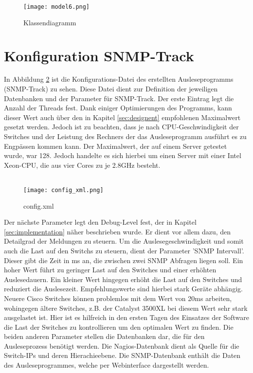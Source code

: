 \begin{figure}[H]
\centering
\texttt{[image: model6.png]}
\caption[]{Klassendiagramm}
\label{fig:classdia6}
\end{figure}

\clearpage

\section*{Konfiguration SNMP-Track}
\label{sec:config}

In Abbildung \ref{fig:config_xml} ist die Konfigurations-Datei des erstellten Ausleseprogramms (SNMP-Track) zu sehen.
Diese Datei dient zur Definition der jeweiligen Datenbanken und der Parameter für SNMP-Track.
Der erste Eintrag legt die Anzahl der Threads fest. Dank einiger Optimierungen des Programms, kann dieser Wert auch über den in Kapitel \ref{sec:designent} empfohlenen Maximalwert gesetzt werden.
Jedoch ist zu beachten, dass je nach CPU-Geschwindigkeit der Switches und der Leistung des Rechners der das Ausleseprogramm ausführt es zu Engpässen kommen kann.
Der Maximalwert, der auf einem Server getestet wurde, war 128. Jedoch handelte es sich hierbei um einen Server mit einer Intel Xeon-CPU, die aus vier Cores zu je 2.8GHz besteht.\\\\

\begin{figure}[H]
\centering
\texttt{[image: config\_xml.png]}
\caption[]{config.xml}
\label{fig:config_xml}
\end{figure}

Der nächste Parameter legt den Debug-Level fest, der in Kapitel \ref{sec:implementation} näher beschrieben wurde.
Er dient vor allem dazu, den Detailgrad der Meldungen zu steuern.
Um die Auslesegeschwindigkeit und somit auch die Last auf den Switchs zu steuern, dient der Parameter 'SNMP Intervall'.
Dieser gibt die Zeit in ms an, die zwischen zwei SNMP Abfragen liegen soll. Ein hoher Wert führt zu geringer Last auf den Switches und einer erhöhten Auslesedauern.
Ein kleiner Wert hingegen erhöht die Last auf den Switches und reduziert die Auslesezeit.
Empfehlungswerte sind hierbei stark Geräte abhängig. Neuere Cisco Switches können problemlos mit dem Wert von 20ms arbeiten, wohingegen ältere Switches, z.B. der Catalyst 3500XL bei diesem Wert sehr stark ausgelastet ist.
Hier ist es hilfreich in den ersten Tagen des Einsatzes der Software die Last der Switches zu kontrollieren um den optimalen Wert zu finden.
Die beiden anderen Parameter stellen die Datenbanken dar, die für den Ausleseprozess benötigt werden.
Die Nagios-Datenbank dient als Quelle für die Switch-IPs und deren Hierachieebene.
Die SNMP-Datenbank enthält die Daten des Ausleseprogrammes, welche per Webinterface dargestellt werden.

